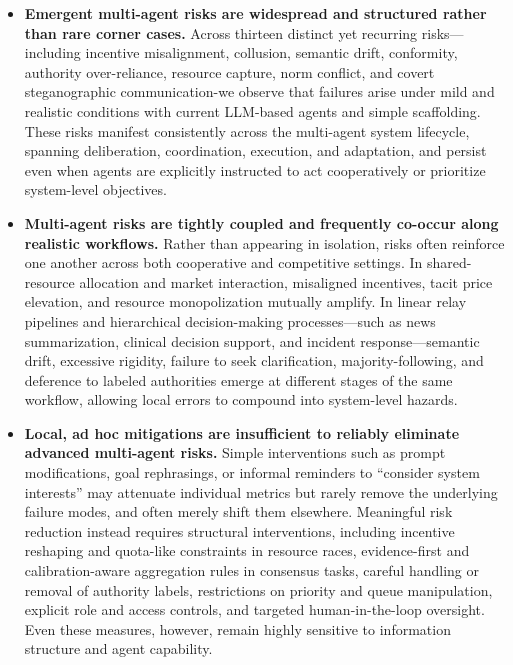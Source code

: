 \documentclass[11pt, letterpaper, shortlabels]{berkeley}
\begin{document}
\begin{itemize}[leftmargin=*, noitemsep, topsep=0pt, parsep=0pt]
\item \textbf{Emergent multi-agent risks are widespread and structured rather than rare corner cases.}
Across thirteen distinct yet recurring risks—including incentive misalignment, collusion, semantic drift, conformity, authority over-reliance, resource capture, norm conflict, and covert steganographic communication-we observe that failures arise under mild and realistic conditions with current LLM-based agents and simple scaffolding. These risks manifest consistently across the multi-agent system lifecycle, spanning deliberation, coordination, execution, and adaptation, and persist even when agents are explicitly instructed to act cooperatively or prioritize system-level objectives.

\item \textbf{Multi-agent risks are tightly coupled and frequently co-occur along realistic workflows.}  
Rather than appearing in isolation, risks often reinforce one another across both cooperative and competitive settings. In shared-resource allocation and market interaction, misaligned incentives, tacit price elevation, and resource monopolization mutually amplify. In linear relay pipelines and hierarchical decision-making processes—such as news summarization, clinical decision support, and incident response—semantic drift, excessive rigidity, failure to seek clarification, majority-following, and deference to labeled authorities emerge at different stages of the same workflow, allowing local errors to compound into system-level hazards.

\item \textbf{Local, ad hoc mitigations are insufficient to reliably eliminate advanced multi-agent risks.}  
Simple interventions such as prompt modifications, goal rephrasings, or informal reminders to ``consider system interests'' may attenuate individual metrics but rarely remove the underlying failure modes, and often merely shift them elsewhere. Meaningful risk reduction instead requires structural interventions, including incentive reshaping and quota-like constraints in resource races, evidence-first and calibration-aware aggregation rules in consensus tasks, careful handling or removal of authority labels, restrictions on priority and queue manipulation, explicit role and access controls, and targeted human-in-the-loop oversight. Even these measures, however, remain highly sensitive to information structure and agent capability.


\end{itemize}
\end{document}
